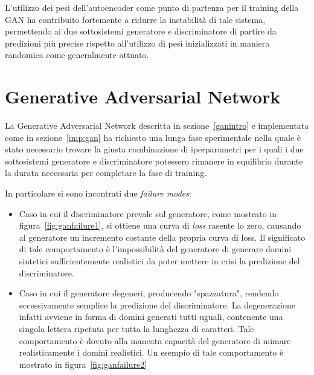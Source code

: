 \newpage
L'utilizzo dei pesi dell'autoencoder come punto di partenza per il training della GAN ha contribuito fortemente a ridurre la instabilità di tale sistema, permettendo ai due sottosistemi generatore e discriminatore di partire da predizioni più precise rispetto all'utilizzo di pesi inizializzati in maniera randomica come generalmente attuato.



\newpage
\section{Generative Adversarial Network}
\label{ris:gan}
La Generative Adversarial Network descritta in sezione~\ref{ganintro} e implementata come in sezione~\ref{imp:gan} ha richiesto una lunga fase sperimentale nella quale è stato necessario trovare la giusta combinazione di iperparametri per i quali i due sottosistemi generatore e discriminatore potessero rimanere in equilibrio durante la durata necessaria per completare la fase di training. 

In particolare si sono incontrati due \textit{failure modes}:
\begin{itemize}
\item Caso in cui il discriminatore prevale sul generatore, come mostrato in figura~\ref{fig:ganfailure1}, si ottiene una curva di \textit{loss} rasente lo zero, causando al generatore un incremento costante della propria curva di loss. Il significato di tale comportamento è l'impossibilità del generatore di generare domini sintetici sufficientemente realistici da poter mettere in crisi la predizione del discriminatore.
\item Caso in cui il generatore degeneri, producendo "spazzatura", rendendo eccessivamente semplice la predizione del discriminatore. La degenerazione infatti avviene in forma di domini generati tutti uguali, contenente una singola lettera ripetuta per tutta la lunghezza di caratteri. Tale comportamento è dovuto alla mancata capacità del generatore di mimare realisticamente i domini realistici. Un esempio di tale comportamento è mostrato in figura~\ref{fig:ganfailure2}
\end{itemize}

